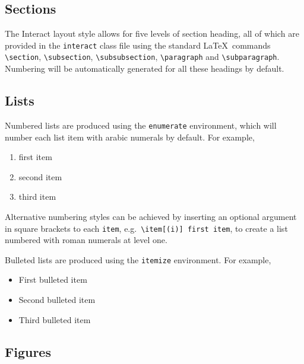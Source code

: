 \documentclass[]{interact}
\theoremstyle{plain}%
\theoremstyle{definition}
\theoremstyle{remark}
\def\tightlist{}
\begin{document}
\hypertarget{sections}{%
\subsection{Sections}\label{sections}}

The \textsf{Interact} layout style allows for five levels of section
heading, all of which are provided in the \texttt{interact} class file
using the standard \LaTeX~commands \texttt{\textbackslash{}section},
\texttt{\textbackslash{}subsection},
\texttt{\textbackslash{}subsubsection},
\texttt{\textbackslash{}paragraph} and
\texttt{\textbackslash{}subparagraph}. Numbering will be automatically
generated for all these headings by default.

\hypertarget{lists}{%
\subsection{Lists}\label{lists}}

Numbered lists are produced using the \texttt{enumerate} environment,
which will number each list item with arabic numerals by default. For
example,

\begin{enumerate}
\def\labelenumi{\arabic{enumi}.}
\tightlist
\item
  first item
\item
  second item
\item
  third item
\end{enumerate}

Alternative numbering styles can be achieved by inserting an optional
argument in square brackets to each \texttt{item},
e.g.~\texttt{\textbackslash{}item{[}(i){]}\ first\ item}, to create a
list numbered with roman numerals at level one.

Bulleted lists are produced using the \texttt{itemize} environment. For
example,

\begin{itemize}
\tightlist
\item
  First bulleted item
\item
  Second bulleted item
\item
  Third bulleted item
\end{itemize}

\hypertarget{figures}{%
\subsection{Figures}\label{figures}}
\end{document}

